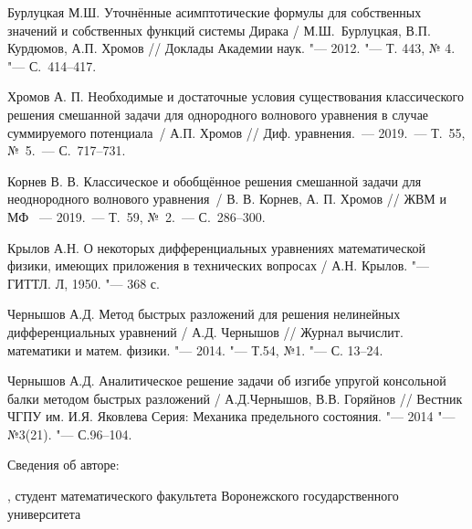 \begin{thebibliography}{99}
    Бурлуцкая М.Ш.   Уточнённые  асимптотические формулы для собственных значений и собственных  функций системы
Дирака / М.Ш.~Бурлуцкая, В.П. Курдюмов, А.П. Хромов // Доклады
Академии наук.
"--- 2012. "--- Т. 443, № 4. "---  С.~414--417.




   Хромов А. П.
      Необходимые и достаточные условия существования классического решения смешанной задачи для однородного
    волнового уравнения в случае суммируемого потенциала~/   А.П. Хромов
    //
    Диф. уравнения.~--- 2019.~--- Т.~55, №~5.~--- С.~717--731.

  Корнев В. В.
    Классическое и обобщённое решения смешанной задачи
    для неоднородного волнового уравнения~/ В. В. Корнев, А. П. Хромов //
    ЖВМ и МФ ~--- 2019.~--- Т.~59, №~2.~--- С.~286--300.

       Крылов А.Н.  О некоторых дифференциальных уравнениях  математической физики, имеющих приложения в технических вопросах / А.Н.
Крылов. "---
 ГИТТЛ. Л, 1950. "--- 368 с.


  Чернышов  А.Д.  Метод быстрых разложений для решения нелинейных
дифференциальных уравнений /  А.Д. Чернышов  // Журнал вычислит.
математики и матем. физики.  "--- 2014. "--- Т.54,  №1. "--- С. 13--24.

  Чернышов  А.Д.  Аналитическое решение задачи об
изгибе упругой консольной балки методом быстрых разложений /
  А.Д.Чернышов, В.В.  Горяйнов // Вестник ЧГПУ им. И.Я. Яковлева Серия:
Механика предельного состояния. "--- 2014 "--- №3(21). "--- С.96--104.



\end{thebibliography}




Сведения об авторе:

,
студент математического факультета Воронежского государственного университета
